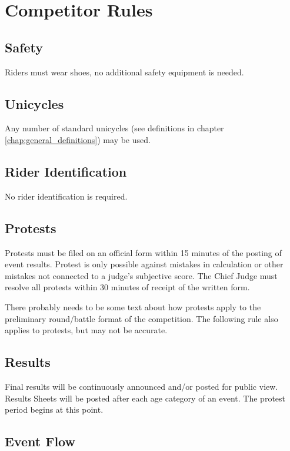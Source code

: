 \chapter{Competitor Rules}

\section{Safety}

Riders must wear shoes, no additional safety equipment is needed.

\section{Unicycles}

Any number of standard unicycles (see definitions in chapter \ref{chap:general_definitions}) may be used.

\section{Rider Identification}

No rider identification is required.

\section{Protests}

Protests must be filed on an official form within 15 minutes of the posting of event results.
Protest is only possible against mistakes in calculation or other mistakes not connected to a judge's subjective score.
The Chief Judge must resolve all protests within 30 minutes of receipt of the written form.

\begin{comment-2016}
There probably needs to be some text about how protests apply to the preliminary round/battle format of the competition.  The following rule also applies to protests, but may not be accurate.
\end{comment-2016}

\section{Results}
Final results will be continuously announced and/or posted for public view.
Results Sheets will be posted after each age category of an event.
The protest period begins at this point.

\section{Event Flow}

